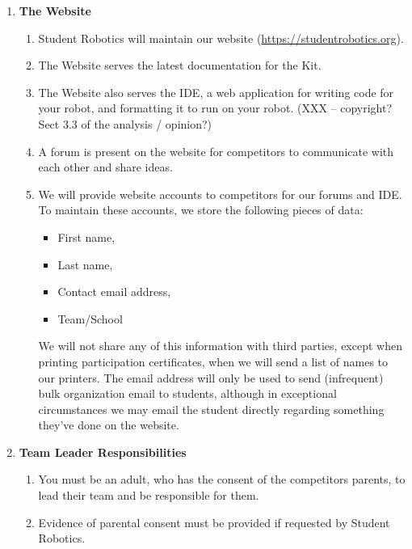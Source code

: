 \documentclass[a4paper, 11pt]{scrartcl}
\begin{document}
\begin{enumerate}
\begin{enumerate}
\begin{enumerate}
\end{enumerate}
\end{enumerate}

\item \textbf{The Website}
\begin{enumerate}

\item Student Robotics will maintain our website (\url{https://studentrobotics.org}).

\item The Website serves the latest documentation for the Kit.

\item The Website also serves the IDE, a web application for writing code for
your robot, and formatting it to run on your robot. (XXX -- copyright?
Sect 3.3 of the analysis / opinion?)

\item A forum is present on the website for competitors to communicate with
each other and share ideas.

\item We will provide website accounts to competitors for our forums and IDE. To
maintain these accounts, we store the following pieces of data:

\begin{itemize}
\item First name,
\item Last name,
\item Contact email address,
\item Team/School
\end{itemize}
We will not share any of this information with third parties, except when
printing participation certificates, when we will send a list of names to
our printers. The email address will only be used to send (infrequent) bulk
organization email to students, although in exceptional circumstances we
may email the student directly regarding something they've done on the
website.

\end{enumerate}

\item \textbf{Team Leader Responsibilities}
\begin{enumerate}

\item You must be an adult, who has the consent of the competitors parents, to
lead their team and be responsible for them.

\item Evidence of parental consent must be provided if requested by Student
Robotics.


\end{enumerate}
\end{enumerate}
\end{document}
